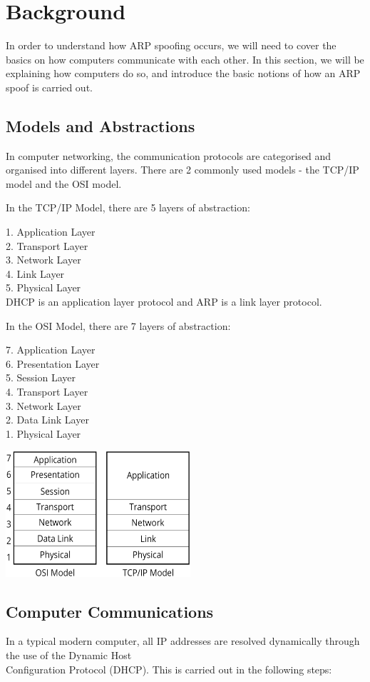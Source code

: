 \documentclass{acm_proc_article-sp}
\begin{document}
\section{Background}
In order to understand how ARP spoofing occurs, we will need to cover the basics on how computers communicate with each other. In this section, we will be explaining how computers do so, and introduce the basic notions of how an ARP spoof is carried out. 

\subsection{Models and Abstractions}
In computer networking, the communication protocols are categorised and organised into different layers. There are 2 commonly used models - the TCP/IP model and the OSI model. 

In the TCP/IP Model, there are 5 layers of abstraction: 

1. Application Layer\\
2. Transport Layer\\
3. Network Layer\\
4. Link Layer\\
5. Physical Layer\\

DHCP is an application layer protocol and ARP is a link layer protocol.

In the OSI Model, there are 7 layers of abstraction:

7. Application Layer \\
6. Presentation Layer \\
5. Session Layer \\
4. Transport Layer \\
3. Network Layer \\
2. Data Link Layer \\
1. Physical Layer 

\includegraphics[width=2.7in]{osi_comparison.eps}

\subsection{Computer Communications}
In a typical modern computer, all IP addresses are resolved dynamically through the use of the Dynamic Host \\Configuration Protocol (DHCP). This is carried out in the following steps: \\
\end{document}
